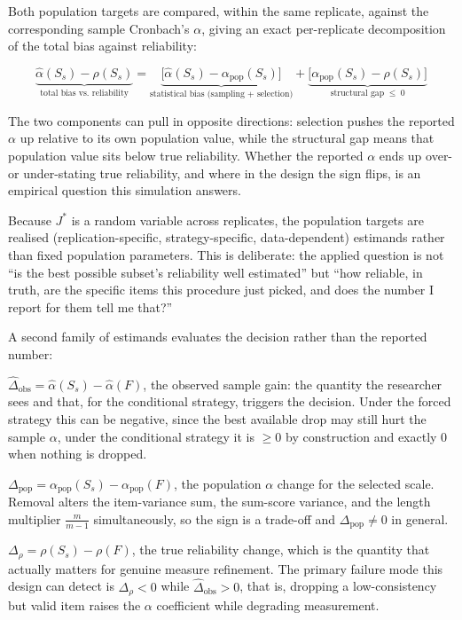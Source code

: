\documentclass[
  nonatbib,
  authoryear,
  preprint]{elsarticle}
\begin{document}
Both population targets are compared, within the same replicate, against
the corresponding sample Cronbach's \(\alpha\), giving an exact
per-replicate decomposition of the total bias against reliability:

\[\underbrace{\hat\alpha(S_s) - \rho(S_s)}_{\text{total bias vs. reliability}} = \underbrace{\big[\hat\alpha(S_s) - \alpha_{\text{pop}}(S_s)\big]}_{\text{statistical bias (sampling + selection)}} + \underbrace{\big[\alpha_{\text{pop}}(S_s) - \rho(S_s)\big]}_{\text{structural gap} \;\leq\; 0}\]

The two components can pull in opposite directions: selection pushes the
reported \(\alpha\) up relative to its own population value, while the
structural gap means that population value sits below true reliability.
Whether the reported \(\alpha\) ends up over- or under-stating true
reliability, and where in the design the sign flips, is an empirical
question this simulation answers.

Because \(J^{*}\) is a random variable across replicates, the population
targets are realised (replication-specific, strategy-specific,
data-dependent) estimands rather than fixed population parameters. This
is deliberate: the applied question is not ``is the best possible
subset's reliability well estimated'' but ``how reliable, in truth, are
the specific items this procedure just picked, and does the number I
report for them tell me that?''

A second family of estimands evaluates the decision rather than the
reported number:

\(\widehat{\Delta}_{\text{obs}} = \hat\alpha(S_s) - \hat\alpha(F)\), the
observed sample gain: the quantity the researcher sees and that, for the
conditional strategy, triggers the decision. Under the forced strategy
this can be negative, since the best available drop may still hurt the
sample \(\alpha\), under the conditional strategy it is \(\geq 0\) by
construction and exactly 0 when nothing is dropped.

\(\Delta_{\text{pop}} = \alpha_{\text{pop}}(S_s) - \alpha_{\text{pop}}(F)\),
the population \(\alpha\) change for the selected scale. Removal alters
the item-variance sum, the sum-score variance, and the length multiplier
\(\tfrac{m}{m-1}\) simultaneously, so the sign is a trade-off and
\(\Delta_{\text{pop}} \neq 0\) in general.

\(\Delta_{\rho} = \rho(S_s) - \rho(F)\), the true reliability change,
which is the quantity that actually matters for genuine measure
refinement. The primary failure mode this design can detect is
\(\Delta_{\rho} < 0\) while \(\widehat{\Delta}_{\text{obs}} > 0\), that
is, dropping a low-consistency but valid item raises the \(\alpha\)
coefficient while degrading measurement.
\end{document}
